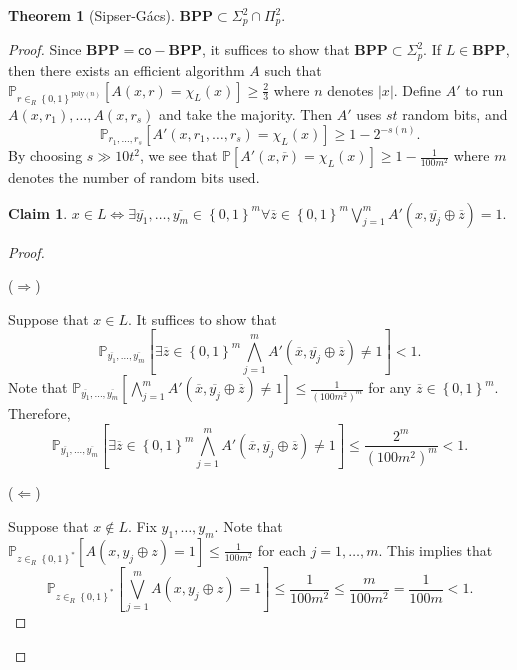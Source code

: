 \documentclass[10pt,letterpaper,cm]{nupset}
\theoremstyle{definition}
\theoremstyle{theorem}
\newtheorem{theorem}[definition]{Theorem}
\newtheorem*{claim}{Claim}
\theoremstyle{remark}
\newcommand{\1}{\mathbf{1}}
\newcommand{\0}{\vec 0}
\begin{document}
\begin{theorem}[Sipser-G\'acs]
$\mathbf{BPP} \subset \Sigma^2_p \cap \Pi^2_p$.
\end{theorem}
\begin{proof}
Since $\mathbf{BPP} = \mathsf{co}{-}\mathbf{BPP}$, it suffices to show that $\mathbf{BPP} \subset \Sigma^2_p$. If $L \in \mathbf{BPP}$, then there exists an efficient algorithm $A$ such that $\mathbb{P}_{r \in_R \left\{0,1\right\}^{\text{poly}(n)}}[A(x,r) = \chi_L(x)] \geq \frac{2}{3}$ where $n$ denotes $\lvert{x}\rvert$. Define $A'$ to run $A(x, r_1), \ldots, A(x, r_s)$ and take the majority. Then $A'$ uses $st$ random bits, and $$\mathbb{P}_{r_1, \ldots, r_s}\left[A'(x, r_1, \ldots, r_s) =\chi_L(x)\right] \geq 1 - 2^{{-}s(n)}.$$ By choosing $s \gg 10t^2$, we see that $\mathbb{P}[A'(x, \overline{r}) = \chi_L(x)] \geq 1 -\frac{1}{100m^2}$ where $m$ denotes the number of random bits used. 
\begin{claim}
$x \in L \iff \exists \overline{y_1}, \ldots, \overline{y_m} \in \left\{0,1\right\}^m \forall \overline{z} \in \left\{0,1\right\}^m \bigvee_{j=1}^m A'(x, \overline{y_j} \oplus \overline{z})=1$.
\end{claim}
\begin{proof} $ $

($\Longrightarrow$) 

\smallskip

Suppose that $x \in L$. It suffices to show that $$   \mathbb{P}_{\overline{y_1}, \ldots, \overline{y_m}} \left[\exists \overline{z} \in \left\{0,1\right\}^m \bigwedge_{j=1}^m A'(\overline{x}, \overline{y_j} \oplus \overline{z}) \ne 1 \right] <1   .$$ Note that $\mathbb{P}_{\overline{y_1}, \ldots, \overline{y_m}} \left[\bigwedge_{j=1}^m  A'(\overline{x}, \overline{y_j} \oplus \overline{z}) \ne 1 \right] \leq \frac{1}{(100m^2)^m}$ for any $\overline{z} \in \left\{0,1\right\}^m$. Therefore, $$      \mathbb{P}_{\overline{y_1}, \ldots, \overline{y_m}}  \left[\exists \overline{z} \in \left\{0,1\right\}^m \bigwedge_{j=1}^m A'(\overline{x}, \overline{y_j} \oplus \overline{z}) \ne 1 \right ]   \leq \frac{2^m}{(100m^2)^m} <1.$$

\medskip

($\Longleftarrow$)  

\smallskip

Suppose that $x \notin L$. Fix $y_1, \ldots, y_m$. Note that $\mathbb{P}_{z \in_R \left\{0,1\right\}^{\ast}}[A(x, y_j \oplus z) =1] \leq \frac{1}{100m^2}$ for each $j=1, \ldots, m$. This implies that $$\mathbb{P}_{z \in_R \left\{0,1\right\}^{\ast}}\left[\bigvee_{j=1}^m A(x, y_j \oplus z) =1\right] \leq \frac{1}{100m^2} \leq \frac{m}{100m^2} = \frac{1}{100m} <1.$$
\end{proof}
\end{proof}
\end{document}
